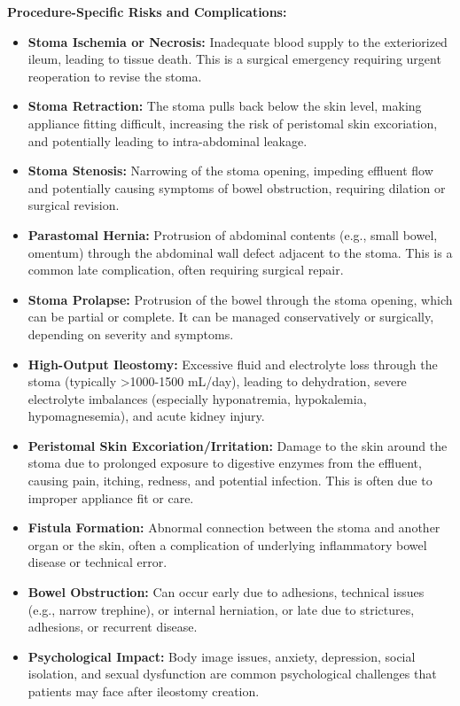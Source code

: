 \textbf{Procedure-Specific Risks and Complications:}
\begin{itemize}
  \item \textbf{Stoma Ischemia or Necrosis:} Inadequate blood supply to the exteriorized ileum, leading to tissue death. This is a surgical emergency requiring urgent reoperation to revise the stoma.
  
  \item \textbf{Stoma Retraction:} The stoma pulls back below the skin level, making appliance fitting difficult, increasing the risk of peristomal skin excoriation, and potentially leading to intra-abdominal leakage.
  
  \item \textbf{Stoma Stenosis:} Narrowing of the stoma opening, impeding effluent flow and potentially causing symptoms of bowel obstruction, requiring dilation or surgical revision.
  
  \item \textbf{Parastomal Hernia:} Protrusion of abdominal contents (e.g., small bowel, omentum) through the abdominal wall defect adjacent to the stoma. This is a common late complication, often requiring surgical repair.
  
  \item \textbf{Stoma Prolapse:} Protrusion of the bowel through the stoma opening, which can be partial or complete. It can be managed conservatively or surgically, depending on severity and symptoms.
  
  \item \textbf{High-Output Ileostomy:} Excessive fluid and electrolyte loss through the stoma (typically >1000-1500 mL/day), leading to dehydration, severe electrolyte imbalances (especially hyponatremia, hypokalemia, hypomagnesemia), and acute kidney injury.
  
  \item \textbf{Peristomal Skin Excoriation/Irritation:} Damage to the skin around the stoma due to prolonged exposure to digestive enzymes from the effluent, causing pain, itching, redness, and potential infection. This is often due to improper appliance fit or care.
  
  \item \textbf{Fistula Formation:} Abnormal connection between the stoma and another organ or the skin, often a complication of underlying inflammatory bowel disease or technical error.
  
  \item \textbf{Bowel Obstruction:} Can occur early due to adhesions, technical issues (e.g., narrow trephine), or internal herniation, or late due to strictures, adhesions, or recurrent disease.
  
  \item \textbf{Psychological Impact:} Body image issues, anxiety, depression, social isolation, and sexual dysfunction are common psychological challenges that patients may face after ileostomy creation.
\end{itemize}

